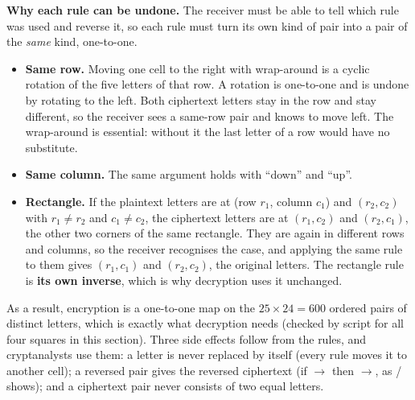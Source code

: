 \textbf{Why each rule can be undone.} The receiver must be able to tell which rule was used and reverse it, so each rule must turn its own kind of pair into a pair of the \emph{same} kind, one-to-one.
\begin{itemize}
  \item \textbf{Same row.} Moving one cell to the right with wrap-around is a cyclic rotation of the five letters of that row. A rotation is one-to-one and is undone by rotating to the left. Both ciphertext letters stay in the row and stay different, so the receiver sees a same-row pair and knows to move left. The wrap-around is essential: without it the last letter of a row would have no substitute.
  \item \textbf{Same column.} The same argument holds with ``down'' and ``up''.
  \item \textbf{Rectangle.} If the plaintext letters are at (row $r_1$, column $c_1$) and $(r_2, c_2)$ with $r_1 \ne r_2$ and $c_1 \ne c_2$, the ciphertext letters are at $(r_1, c_2)$ and $(r_2, c_1)$, the other two corners of the same rectangle. They are again in different rows and columns, so the receiver recognises the case, and applying the same rule to them gives $(r_1, c_1)$ and $(r_2, c_2)$, the original letters. The rectangle rule is \textbf{its own inverse}, which is why decryption uses it unchanged.
\end{itemize}
As a result, encryption is a one-to-one map on the $25 \times 24 = 600$ ordered pairs of distinct letters, which is exactly what decryption needs (checked by script for all four squares in this section). Three side effects follow from the rules, and cryptanalysts use them: a letter is never replaced by itself (every rule moves it to another cell); a reversed pair gives the reversed ciphertext (if $\to$ then $\to$, as / shows); and a ciphertext pair never consists of two equal letters.

